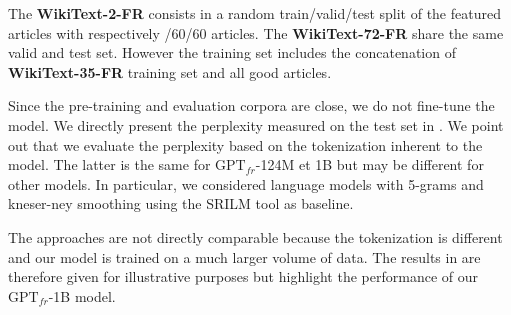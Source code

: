 The \textbf{WikiText-2-FR} consists in a random train/valid/test split of the featured articles with respectively /60/60 articles. The \textbf{WikiText-72-FR} share the same valid and test set. However the training set includes the concatenation of \textbf{WikiText-35-FR} training set and all good articles.

\begin{table}[!ht]
\footnotesize
{}
\caption{Descriptive statistics for the corpora \textbf{WikiText-FR}. We evaluate the vocabulary size using the MOSES tokenizer \parencite{koehn_07}. Tokens out of vocabulary correspond to those that occur fewer than three times.}
\end{table}

Since the pre-training and evaluation corpora are close, we do not fine-tune the model. We directly present the perplexity measured on the test set in . We point out that we evaluate the perplexity based on the tokenization inherent to the model. The latter is the same for $\text{GPT}_{fr}$-124M et 1B but may be different for other models. In particular, we considered language models with 5-grams and kneser-ney smoothing \parencite{ney_94} using the SRILM tool \parencite{stolcke_02} as baseline.

The approaches are not directly comparable because the tokenization is different and our model is trained on a much larger volume of data. The results in  are therefore given for illustrative purposes but highlight the performance of our $\text{GPT}_{fr}$-1B model. 

